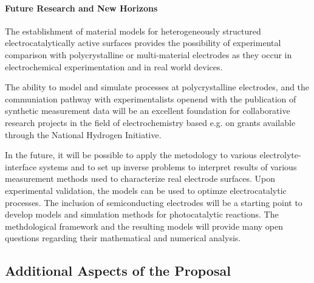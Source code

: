\documentclass[a4paper,10pt]{article}
\begin{document}
\paragraph{Future Research and New Horizons}
The establishment of material models for heterogeneously structured electrocatalytically active surfaces
provides the possibility of experimental comparison with polycrystalline or  multi-material electrodes
as they occur in electrochemical experimentation and in real world devices.

The ability to model and simulate processes at polycrystalline electrodes, and the communiation pathway with experimentalists openend with the publication of synthetic measurement data will be an excellent foundation
for collaborative research projects in the field of electrochemistry based e.g. on grants available through
the National Hydrogen Initiative.

In the future, it will be possible to apply the metodology to various electrolyte-interface systems
and to set up inverse problems to interpret results of various measurement methods used to characterize real electrode surfaces. Upon experimental validation, the models can be used to optimze electrocatalytic processes.
The inclusion of semiconducting electrodes will be a starting point to develop models and simulation methods
for photocatalytic reactions.
The methdological framework and the resulting models will provide many open questions regarding their
mathematical and numerical analysis.








\subsection*{Additional Aspects of the Proposal}
\end{document}
